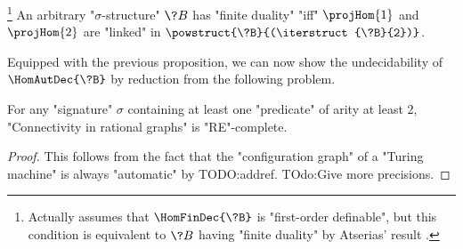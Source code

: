 
\begin{proposition}%
	\!\footnote{Actually \cite[Theorem 4.7]{LaroseLotenTardif2007CharacterisationFOCSP} assumes
	that $\HomFinDec{\?B}$ is "first-order definable", but this condition
	is equivalent to $\?B$ having "finite duality" by Atserias' result
	\cite[Corollary 4]{Atserias2008DigraphColoring}.}%
	\AP\label{prop:characterization-finite-duality-path-projections}
	An arbitrary "$\sigma$-structure" $\?B$ has "finite duality" "iff"
	$\projHom{1}$ and $\projHom{2}$ are "linked" in $\powstruct{\?B}{(\iterstruct{\?B}{2})}$.
\end{proposition}

Equipped with the previous proposition, we can now show the undecidability 
of $\HomAutDec{\?B}$ by reduction from the following problem.

\begin{property}
	\AP\label{prop:undecidability-connectivity}
	For any "signature" $\sigma$ containing at least one "predicate" of
	arity at least 2, "Connectivity in rational graphs" is "RE"-complete.
\end{property}

\begin{proof}
	This follows from the fact that the "configuration graph" of
	a "Turing machine" is always "automatic" by TODO:addref.
	TOdo:Give more precisions.
\end{proof}

